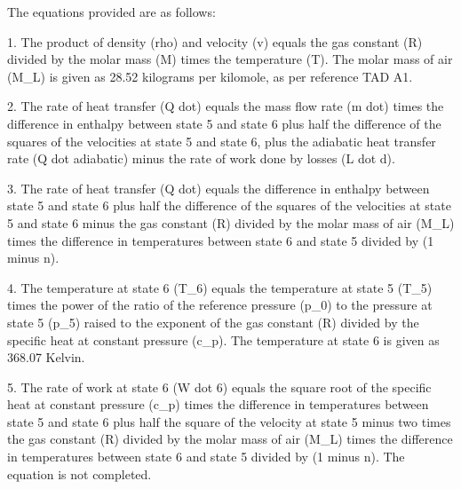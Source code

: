 The equations provided are as follows:

1. The product of density (rho) and velocity (v) equals the gas constant (R) divided by the molar mass (M) times the temperature (T). The molar mass of air (M_L) is given as 28.52 kilograms per kilomole, as per reference TAD A1.

2. The rate of heat transfer (Q dot) equals the mass flow rate (m dot) times the difference in enthalpy between state 5 and state 6 plus half the difference of the squares of the velocities at state 5 and state 6, plus the adiabatic heat transfer rate (Q dot adiabatic) minus the rate of work done by losses (L dot d).

3. The rate of heat transfer (Q dot) equals the difference in enthalpy between state 5 and state 6 plus half the difference of the squares of the velocities at state 5 and state 6 minus the gas constant (R) divided by the molar mass of air (M_L) times the difference in temperatures between state 6 and state 5 divided by (1 minus n).

4. The temperature at state 6 (T_6) equals the temperature at state 5 (T_5) times the power of the ratio of the reference pressure (p_0) to the pressure at state 5 (p_5) raised to the exponent of the gas constant (R) divided by the specific heat at constant pressure (c_p). The temperature at state 6 is given as 368.07 Kelvin.

5. The rate of work at state 6 (W dot 6) equals the square root of the specific heat at constant pressure (c_p) times the difference in temperatures between state 5 and state 6 plus half the square of the velocity at state 5 minus two times the gas constant (R) divided by the molar mass of air (M_L) times the difference in temperatures between state 6 and state 5 divided by (1 minus n). The equation is not completed.